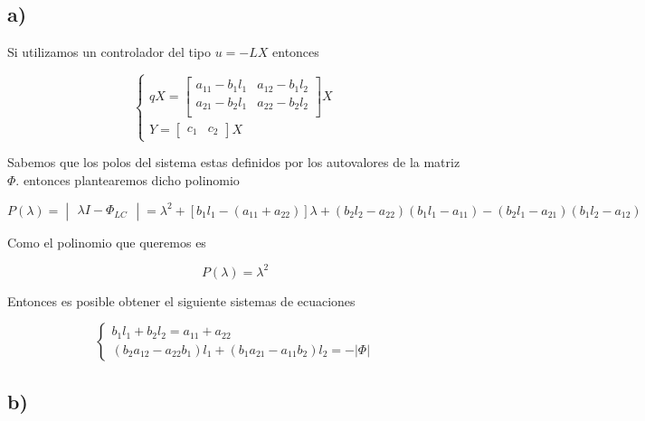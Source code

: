 \documentclass[11pt,a4paper]{article}
\newcommand{\siseq}[1]{ \left\{ \begin{array}{c}
    #1
\end{array} \right. }
\begin{document}
   \subsection*{a)}

   Si utilizamos un controlador del tipo $u=-LX$ entonces 

   \begin{equation}
       \siseq{
           qX = 
           \begin{bmatrix}
               a_{11} - b_1l_1 & a_{12} - b_1l_2 \\
               a_{21} - b_2l_1 & a_{22} - b_2l_2 \\
           \end{bmatrix}X \\
           Y = 
           \begin{bmatrix}
               c_1 & c_2
           \end{bmatrix} X
       }
   \end{equation}

   Sabemos que los polos del sistema estas definidos por los autovalores de la matriz $\Phi$. 
   entonces plantearemos dicho polinomio 

   \begin{equation}
       P(\lambda) = 
       \begin{vmatrix}
           \lambda I - \Phi_{LC}
       \end{vmatrix} = 
       \lambda ^ 2 
       + 
       [b_1l_1 - (a_{11} + a_{22})]\lambda
       + (b_2l_2-a_{22})(b_1l_1 - a_{11}) - (b_2l_1 - a_{21})(b_1l_2 - a_{12})
   \end{equation}

   Como el polinomio que queremos es 

   \begin{equation}
       P(\lambda) = \lambda^2
   \end{equation}

   Entonces es posible obtener el siguiente sistemas de ecuaciones 

   \begin{equation}
    \label{eq:7-zeros}
       \siseq{
           b_1l_1 + b_2l_2 = a_{11} + a_{22} \\ 
           (b_2a_{12} - a_{22}b_1 ) l_1 + 
           (b_1a_{21} - a_{11}b_2) l_2 = - |\Phi|
       }
   \end{equation}

   \subsection*{b)}
\end{document}
